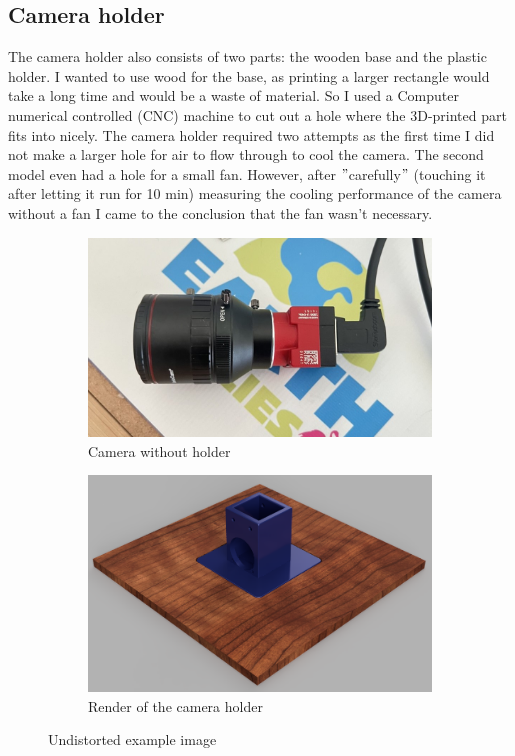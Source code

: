 \subsection{Camera holder}\label{subsec:camera-holder}
The camera holder also consists of two parts: the wooden base and the plastic holder.
I wanted to use wood for the base, as printing a larger rectangle would take a long time and would be a waste of material.
So I used a Computer numerical controlled (CNC) machine to cut out a hole where the 3D-printed part fits into nicely.
The camera holder required two attempts as the first time I did not make a larger hole for air to flow through to cool the camera.
The second model even had a hole for a small fan.
However, after \("\)carefully\("\) (touching it after letting it run for 10 min) measuring the cooling performance of the camera without a fan I came to the conclusion that the fan wasn't necessary.
\begin{figure}[H]
    \centering
    \begin{subfigure}{.5\textwidth}
        \centering
        \includegraphics[width=.8\textwidth]{../photos/cam}
        \caption[cam]{Camera without holder}
        \label{fig:cam}
    \end{subfigure}%
    \begin{subfigure}{.5\textwidth}
        \centering
        \includegraphics[width=.8\textwidth]{../photos/camholder_render}
        \caption[camholder]{Render of the camera holder}
        \label{fig:camholder_render}
    \end{subfigure}
    \caption{Undistorted example image}
    \label{fig:camholder}
\end{figure}